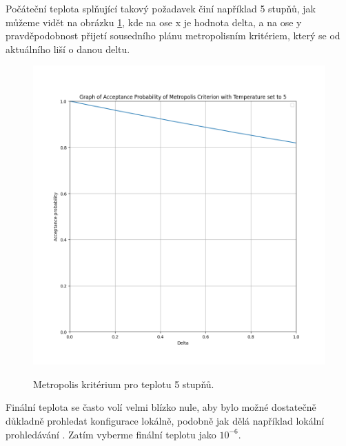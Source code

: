 Počáteční teplota splňující takový požadavek činí například 5 stupňů, jak můžeme vidět na obrázku \ref{img:metropolis_5},
kde na ose x je hodnota delta, a na ose y pravděpodobnost přijetí sousedního plánu metropolisním kritériem, který se od aktuálního liší o danou deltu.

\begin{figure}[H]
  \caption{Metropolis kritérium pro teplotu 5 stupňů.}
  \includegraphics[width=\textwidth]{img/metropolis_5.png}
  \centering
  \label{img:metropolis_5}
\end{figure}

Finální teplota se často volí velmi blízko nule, aby bylo možné dostatečně důkladně prohledat konfigurace lokálně, podobně jak dělá například lokální prohledávání \cite{sa_theory}.
Zatím vyberme finální teplotu jako $10^{-6}$.

